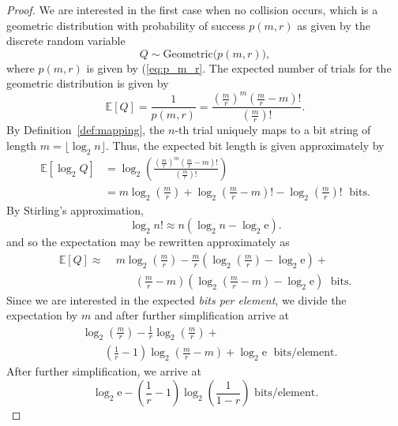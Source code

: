 \documentclass[hidelinks,11pt,final]{article}
\theoremstyle{plain}
\newcommand{\geodist}{\mathrm{Geometric}}
\newcommand{\Expect}[1]{\mathbb{E}\left[#1\right]}
\begin{document}
\begin{proof}
We are interested in the first case when no collision occurs, which is a geometric distribution with probability of success $p(m,r)$ as given by the discrete random variable
\begin{equation}
    Q \sim \geodist\!\bigl(p\!\left(m,r\right)\bigr),
\end{equation}
where $p(m,r)$ is given by (\ref{eq:p_m_r}. The expected number of trials for the geometric distribution is given by
\begin{equation}
    \Expect{Q} = \frac{1}{p(m,r)} = \frac{\left(\frac{m}{r}\right)^m \left(\frac{m}{r}-m\right)!}{\left(\frac{m}{r}\right)!}.
\end{equation}
By Definition~\ref{def:mapping}, the $n$-th trial uniquely maps to a bit string of length $m = \lfloor \log_2 n \rfloor$. Thus, the expected bit length is given approximately by
\begin{align}
    \Expect{\log_2 Q}
        &= \log_2\!\left(\frac{\left(\frac{m}{r}\right)^m \left(\frac{m}{r}-m\right)!}{\left(\frac{m}{r}\right)!}\right)\\
        &= m \log_2\!\left(\frac{m}{r}\right) +
            \log_2\!\left(\frac{m}{r}-m\right)! - \log_2\!\left(\frac{m}{r}\right)! \; \text{ bits}.
\end{align}
By Stirling's approximation, 
\begin{equation}
    \log_2 n! \approx n \left(\log_2 n - \log_2 \mathrm{e}\right).
\end{equation}
and so the expectation may be rewritten approximately as
\begin{equation}
\begin{split}
    \Expect{Q} \approx &\;
        m \log_2\!\left(\frac{m}{r}\right) -
            \frac{m}{r} \left(\log_2\!\left(\frac{m}{r}\right) - \log_2 \mathrm{e}\right) +\\
        &\qquad\left(\frac{m}{r}-m\right) \left(\log_2\!\left(\frac{m}{r}-m\right) - \log_2 \mathrm{e} \right) \; \text{ bits}.
\end{split}
\end{equation}
Since we are interested in the expected \emph{bits per element}, we divide the expectation by $m$ and after further simplification arrive at
\begin{equation}
\begin{split}
    &\log_2\!\left(\frac{m}{r}\right) - \frac{1}{r} \log_2\!\left(\frac{m}{r}\right) +\\
    &\qquad \left(\frac{1}{r}-1\right) \log_2\!\left(\frac{m}{r}-m\right) + \log_2 \mathrm{e} \; \text{ bits/element}.
\end{split}
\end{equation}
After further simplification, we arrive at
\begin{equation}
    \log_2 \mathrm{e} - \left(\frac{1}{r} - 1\right) \log_2\!\left(\frac{1}{1-r}\right) \text{ bits/element}.
\end{equation}
\end{proof}
\end{document}

